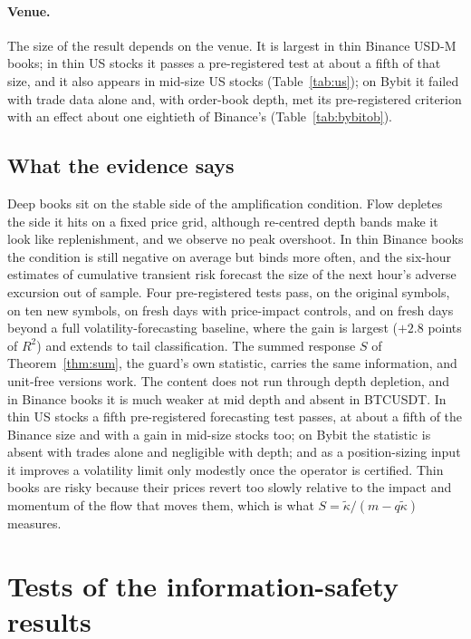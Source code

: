 \documentclass[12pt]{article}
\theoremstyle{definition}
\theoremstyle{remark}
\begin{document}
\paragraph{Venue.} The size of the result depends on the venue. It is largest in thin Binance USD-M books; in thin US stocks it passes a pre-registered test at about a fifth of that size, and it also appears in mid-size US stocks (Table~\ref{tab:us}); on Bybit it failed with trade data alone and, with order-book depth, met its pre-registered criterion with an effect about one eightieth of Binance's (Table~\ref{tab:bybitob}).

\subsection{What the evidence says}\label{sec:thin_summary}
Deep books sit on the stable side of the amplification condition. Flow depletes the side it hits on a fixed price grid, although re-centred depth bands make it look like replenishment, and we observe no peak overshoot. In thin Binance books the condition is still negative on average but binds more often, and the six-hour estimates of cumulative transient risk forecast the size of the next hour's adverse excursion out of sample. Four pre-registered tests pass, on the original symbols, on ten new symbols, on fresh days with price-impact controls, and on fresh days beyond a full volatility-forecasting baseline, where the gain is largest ($+2.8$ points of $R^2$) and extends to tail classification. The summed response $S$ of Theorem~\ref{thm:sum}, the guard's own statistic, carries the same information, and unit-free versions work. The content does not run through depth depletion, and in Binance books it is much weaker at mid depth and absent in BTCUSDT. In thin US stocks a fifth pre-registered forecasting test passes, at about a fifth of the Binance size and with a gain in mid-size stocks too; on Bybit the statistic is absent with trades alone and negligible with depth; and as a position-sizing input it improves a volatility limit only modestly once the operator is certified. Thin books are risky because their prices revert too slowly relative to the impact and momentum of the flow that moves them, which is what $S=\tilde\kappa/(m-q\tilde\kappa)$ measures.
\FloatBarrier
\section{Tests of the information-safety results}\label{sec:istests}
\end{document}

